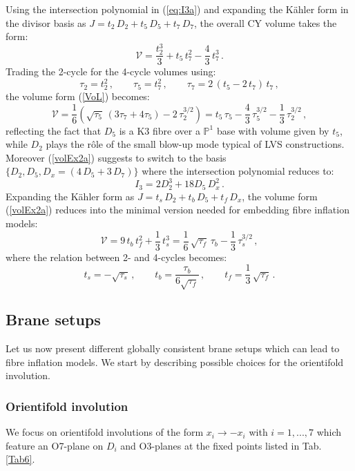 \documentclass[11pt,a4paper]{article}
\newcommand{\be}{\begin{equation}}
\newcommand{\ee}{\end{equation}}
\def\nn{\nonumber}
\def\P{{\mathbb P}}
\newcommand\vo{{\mathcal{V}}}
\begin{document}
Using the intersection polynomial in (\ref{eq:I3a}) and expanding the K\"ahler form in the divisor basis as $J = t_2 \, D_2 + t_5 \, D_5 + t_7 \, D_7$, the overall CY volume takes the form:
\be
\vo = \frac{t_2^3}{3} + t_5\, t_7^2 - \frac43 \, t_7^3\,.
\label{VoL}
\ee
Trading the 2-cycle for the 4-cycle volumes using:
\be
\tau_2 = t_2^2\,, \qquad \tau_5 = t_7^2\,, \qquad  \tau_7 = 2 \,(t_5 - 2\, t_7) \, t_7\,,  \nn
\ee
the volume form (\ref{VoL}) becomes:
\be
\vo = \frac16 \left( \sqrt{\tau_5} \, (3 \tau_7 + 4 \tau_5) - 2 \, \tau_2^{3/2}\right) = t_5\,\tau_5 - \frac43\, \tau_5^{3/2}-\frac13\, \tau_2^{3/2}\,,
\label{volEx2a}
\ee
reflecting the fact that $D_5$ is a K3 fibre over a $\P^1$ base with volume given by $t_5$, while $D_2$ plays the r\^ole of the small blow-up mode typical of LVS constructions. Moreover (\ref{volEx2a}) suggests to switch to the basis $\{D_2, D_5, D_x =(4\,D_5+3\,D_7) \}$ where the intersection polynomial reduces to:
\be
I_3 = 2 D_2^3 + 18 D_5\, D_x^2\,.
\ee
Expanding the K\"ahler form as $J = t_s \, D_2 + t_b \, D_5 + t_f \, D_x$, the volume form (\ref{volEx2a}) reduces into the minimal version needed for embedding fibre inflation models:
\be
\vo = 9\, t_b \, t_f^2 + \frac13\, t_s^3 = \frac16\, \sqrt{\tau_f}\,\tau_b - \frac13\,\tau_s^{3/2}\,,
\label{SimpVol}
\ee
where the relation between 2- and 4-cycles becomes:
\be
t_s = - \sqrt{\tau_s}\,, \qquad t_b =\frac{\tau_b}{6 \sqrt{\tau_f}}\,, \qquad t_f = \frac13\,\sqrt{\tau_f}\,.
\ee

\subsection{Brane setups}

Let us now present different globally consistent brane setups which can lead to fibre inflation models. We start by describing possible choices for the orientifold involution.

\subsubsection{Orientifold involution}

We focus on orientifold involutions of the form $x_i \to -x_i$ with $i=1,...,7$ which feature an O7-plane on $D_i$ and O3-planes at the fixed points listed in Tab. \ref{Tab6}. 
\end{document}
